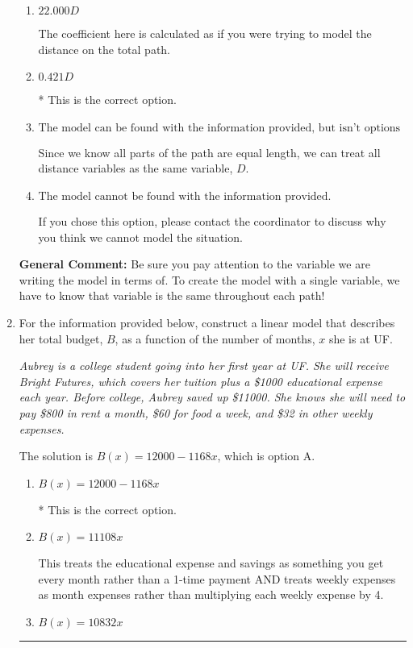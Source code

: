\documentclass{extbook}[14pt]
\newcommand{\litem}[1]{\item #1

\rule{\textwidth}{0.4pt}}
\begin{document}
\begin{enumerate}
{\begin{enumerate}[label=\Alph*.]
The coefficient here is calculated by multiplying the distances together rather than adding.
\item \( 22.000 D \)

The coefficient here is calculated as if you were trying to model the distance on the total path.
\item \( 0.421 D \)

* This is the correct option.
\item \( \text{The model can be found with the information provided, but isn't options 1-3.} \)

Since we know all parts of the path are equal length, we can treat all distance variables as the same variable, $D$.
\item \( \text{The model cannot be found with the information provided.} \)

If you chose this option, please contact the coordinator to discuss why you think we cannot model the situation.
\end{enumerate}

\textbf{General Comment:} Be sure you pay attention to the variable we are writing the model in terms of. To create the model with a single variable, we have to know that variable is the same throughout each path!
}
\litem{
For the information provided below, construct a linear model that describes her total budget, $B$, as a function of the number of months, $x$ she is at UF.

\begin{center}
    \textit{ Aubrey is a college student going into her first year at UF. She will receive Bright Futures, which covers her tuition plus a \$1000 educational expense each year. Before college, Aubrey saved up \$11000. She knows she will need to pay \$800 in rent a month, \$60 for food a week, and \$32 in other weekly expenses. }
\end{center}
The solution is \( B(x) = 12000 - 1168 x \), which is option A.\begin{enumerate}[label=\Alph*.]
\item \( B(x) = 12000 - 1168 x \)

* This is the correct option.
\item \( B(x) = 11108 x \)

This treats the educational expense and savings as something you get every month rather than a 1-time payment AND treats weekly expenses as month expenses rather than multiplying each weekly expense by 4.
\item \( B(x) = 10832 x \)


\end{enumerate}}
\end{enumerate}
\end{document}
